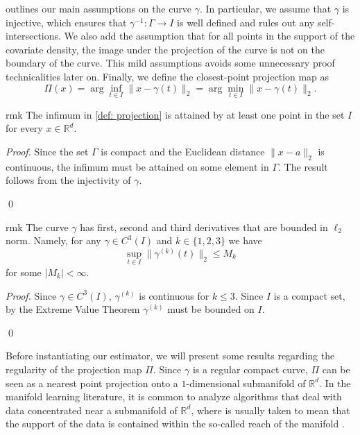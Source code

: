 \documentclass[11pt]{article}
\begin{document}
 outlines our main assumptions on the curve $\gamma$. In particular, we assume that $\gamma$ is injective, which ensures that $\gamma^{-1}:\Gamma\rightarrow I$ is well defined and rules out any self-intersections. We also add the assumption that for all points in the support of the covariate density, the image under the projection of the curve is not on the boundary of the curve. This mild assumptions avoids some unnecessary proof technicalities later on. Finally, we define the closest-point projection map as
\begin{equation}\label{def: projection}
\Pi(x) = \arg\inf_{t\in I}\|x - \gamma(t)\|_2 = \arg\min_{t\in I}\|x - \gamma(t)\|_2.
\end{equation}
\begin{restatable}{rmk}{} \label{remark: infimum}
    The infimum in \cref{def: projection} is attained by at least one point in the set $I$ for every $x \in \mathbb{R}^d$.
\end{restatable}
\noindent \textit{Proof.} Since the set $\Gamma$ is compact and the Euclidean distance $\|x-a\|_2$ is continuous, the infimum must be attained on some element in $\Gamma$. The result follows from the injectivity of $\gamma$. 

\qed{}


\begin{restatable}{rmk}{} \label{remark: deriv bound}
    The curve $\gamma$ has first, second and third derivatives that are bounded in $\ell_2$ norm. Namely, for any $\gamma \in C^3(I)$ and $k \in \{1,2,3\}$ we have 
    \[\sup_{t\in I}\|\gamma^{(k)}(t)\|_2 \leq M_k\]
    for some $|M_k| < \infty$.
\end{restatable}
\noindent \textit{Proof.} Since $\gamma \in C^3(I)$, $\gamma^{(k)}$ is continuous for $k \leq 3$. Since $I$ is a compact set, by the Extreme Value Theorem $\gamma^{(k)}$ must be bounded on $I$. 

\qed{}



Before instantiating our estimator, we will present some results regarding the regularity of the projection map $\Pi$. Since $\gamma$ is a regular compact curve, $\Pi$ can be seen as a nearest point projection onto a $1$-dimensional submanifold of $\mathbb{R}^d$. In the manifold learning literature, it is common to analyze algorithms that deal with data concentrated near a submanifold of $\mathbb{R}^d$, where  is usually taken to mean that the support of the data is contained within the so-called reach of the manifold \cite{genovese2012minimax, balakrishnan2012minimax, kokotnoisy, saidi2024recovering}.
\end{document}
